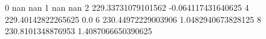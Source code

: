 0 nan nan
1 nan nan
2 229.33731079101562 -0.064117431640625
4 229.40142822265625 0.0
6 230.44972229003906 1.0482940673828125
8 230.8101348876953 1.4087066650390625
